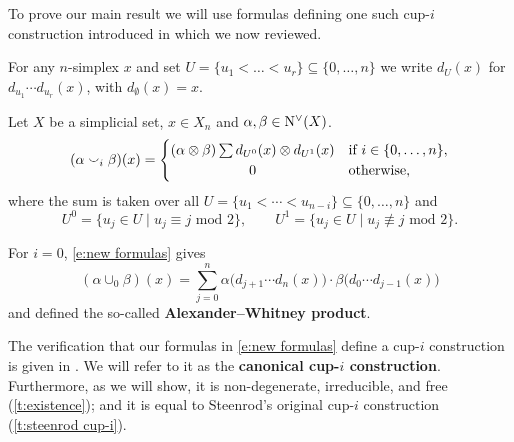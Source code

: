 To prove our main result we will use formulas defining one such \mbox{cup-$i$} construction introduced in \cite{medina2021fast_sq} which we now reviewed.

\begin{notation}
	For any $n$-simplex $x$ and set $U = \{u_1 < \dots < u_r\} \subseteq \big\{ 0, \dots, n \big\}$ we write $d_U(x)$ for $d_{u_1}\! \dotsm d_{u_r}(x)$, with $d_{\emptyset}(x) = x$.
\end{notation}

\begin{definition} \label{d:my cup-i construction}
	Let $X$ be a simplicial set, $x \in X_n$ and $\alpha, \beta \in \operatorname{N^{\vee}}(X)$.
	\begin{equation} \label{e:new formulas}
	(\alpha \cup_i \beta)(x) =
	\begin{cases}
	(\alpha \ot \beta) \sum d_{U^0}(x) \ot d_{U^1}(x) &
	\text{if } i \in \{0, \dots, n\}, \\
	\hfil 0 &
	\text{otherwise},
	\end{cases}
	\end{equation}
	where the sum is taken over all $U = \{u_1 < \cdots < u_{n-i}\} \subseteq \{0, \dots, n\}$ and
	\begin{equation*}
	U^0 = \{u_j \in U \mid u_j \equiv j \text{ mod } 2\}, \qquad
	U^1 = \{u_j \in U \mid u_j \not\equiv j \text{ mod } 2\}.
	\end{equation*}
\end{definition}

\begin{example} \label{ex:alexander-whitney diagonal}
	For $i = 0$, \cref{e:new formulas} gives
	\begin{equation*}
	(\alpha \cup_0 \beta)(x) =
	\sum_{j=0}^n \alpha \big(d_{j+1} \cdots d_{n}(x)\big) \cdot \beta \big(d_{0} \cdots d_{j-1}(x)\big)
	\end{equation*}
	and defined the so-called \textbf{Alexander--Whitney product}.
\end{example}

The verification that our formulas in \cref{e:new formulas} define a \mbox{cup-$i$} construction is given in \cite{medina2021fast_sq}.
We will refer to it as the \textbf{canonical \mbox{cup-$i$} construction}.
Furthermore, as we will show, it is non-degenerate, irreducible, and free (\cref{t:existence}); and it is equal to Steenrod's original cup-$i$ construction (\cref{t:steenrod cup-i}).

%

